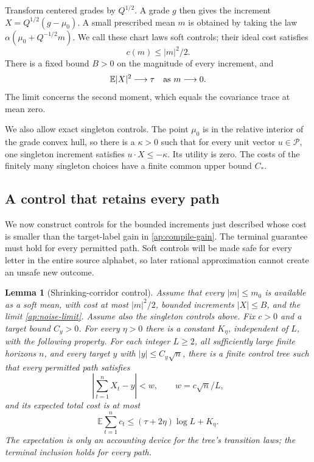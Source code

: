 \documentclass[11pt]{article}
\numberwithin{equation}{section}
\newtheorem{lemma}[theorem]{Lemma}
\theoremstyle{definition}
\theoremstyle{remark}
\begin{document}
Transform centered grades by \(Q^{1/2}\).  A grade \(g\) then gives the
increment \(X=Q^{1/2}(g-\mu_0)\).  A small prescribed mean \(m\) is
obtained by taking the law
\(\alpha(\mu_0+Q^{-1/2}m)\).  We call these chart laws soft controls;
their ideal cost satisfies
\begin{equation}\label{ap:drift-cost}
 c(m)\leq |m|^2/2.
\end{equation}
There is a fixed bound \(B>0\) on the magnitude of every increment, and
\begin{equation}\label{ap:noise-limit}
 \mathbb E|X|^2\longrightarrow\tau\quad\hbox{as }m\longrightarrow0.
\end{equation}
The limit concerns the second moment, which equals the covariance trace
at mean zero.

We also allow exact singleton controls.  The point \(\mu_0\) is in the
relative interior of the grade convex hull, so there is a \(\kappa>0\)
such that for every unit vector \(u\in\mathcal P\), one singleton
increment satisfies \(u\cdot X\leq-\kappa\).  Its utility is zero.
The costs of the finitely many singleton choices have a finite common
upper bound \(C_*\).

\subsection{A control that retains every path}

We now construct controls for the bounded increments just described whose
cost is smaller than the target-label gain in \eqref{ap:compile-gain}.
The terminal guarantee must hold for every permitted path.  Soft controls
will be made safe for every letter in the entire source alphabet, so later
rational approximation cannot create an unsafe new outcome.

\begin{lemma}[Shrinking-corridor control]\label{ap:corridor}
Assume that every \(|m|\leq m_0\) is available as a soft mean, with
cost at most \(|m|^2/2\), bounded increments \(|X|\leq B\), and the
limit \eqref{ap:noise-limit}.  Assume also the singleton controls above.
Fix \(c>0\) and a target bound \(C_y>0\).  For every \(\eta>0\)
there is a constant \(K_\eta\), independent of \(L\), with the following
property.  For each integer \(L\geq2\), all sufficiently large finite
horizons \(n\), and every target \(y\) with \(|y|\leq C_y\sqrt n\),
there is a finite control tree such that every permitted path satisfies
\[
 \left|\sum_{t=1}^n X_t-y\right|<w,
 \qquad w=c\sqrt n/L,
\]
and its expected total cost is at most
\begin{equation}\label{ap:total-cost}
 \mathbb E\sum_{t=1}^n c_t\leq(\tau+2\eta)\log L+K_\eta.
\end{equation}
The expectation is only an accounting device for the tree's transition
laws; the terminal inclusion holds for every path.
\end{lemma}
\end{document}
